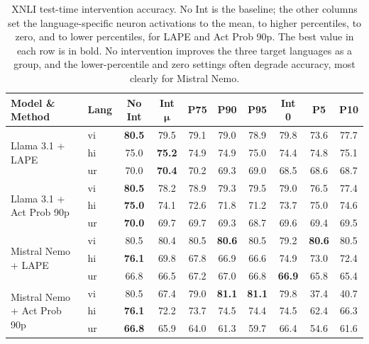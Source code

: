\begin{table}[t]
	\centering
	\renewcommand{\arraystretch}{1.2}
	\setlength{\tabcolsep}{5pt}
	\begin{small}
		\begin{tabular}{llcccccccc}
			\toprule
			\textbf{Model \& Method} & \textbf{Lang} & \textbf{No Int} & \textbf{Int} $\bm{\mu}$ & \textbf{P75} & \textbf{P90} & \textbf{P95} & \textbf{Int 0} & \textbf{P5} & \textbf{P10} \\
			\midrule
			\multirow{3}{*}{Llama 3.1 + LAPE}
			& vi & \textbf{80.5} & 79.5 & 79.1 & 79.0 & 78.9 & 79.8 & 73.6 & 77.7 \\
			& hi & 75.0 & \textbf{75.2} & 74.9 & 74.9 & 75.0 & 74.4 & 74.8 & 75.1 \\
			& ur & 70.0 & \textbf{70.4} & 70.2 & 69.3 & 69.0 & 68.5 & 68.6 & 68.7 \\
			\midrule
			\multirow{3}{*}{Llama 3.1 + Act Prob 90p}
			& vi & \textbf{80.5} & 78.2 & 78.9 & 79.3 & 79.5 & 79.0 & 76.5 & 77.4 \\
			& hi & \textbf{75.0} & 74.1 & 72.6 & 71.8 & 71.2 & 73.7 & 75.0 & 74.6 \\
			& ur & \textbf{70.0} & 69.7 & 69.7 & 69.3 & 68.7 & 69.6 & 69.4 & 69.5 \\
			\midrule
			\multirow{3}{*}{Mistral Nemo + LAPE}
			& vi & 80.5 & 80.4 & 80.5 & \textbf{80.6} & 80.5 & 79.2 & \textbf{80.6} & 80.5 \\
			& hi & \textbf{76.1} & 69.8 & 67.8 & 66.9 & 66.6 & 74.9 & 73.0 & 72.4 \\
			& ur & 66.8 & 66.5 & 67.2 & 67.0 & 66.8 & \textbf{66.9} & 65.8 & 65.4 \\
			\midrule
			\multirow{3}{*}{Mistral Nemo + Act Prob 90p}
			& vi & 80.5 & 67.4 & 79.0 & \textbf{81.1} & \textbf{81.1} & 79.8 & 37.4 & 40.7 \\
			& hi & \textbf{76.1} & 72.2 & 73.7 & 74.5 & 74.4 & 74.5 & 62.4 & 66.3 \\
			& ur & \textbf{66.8} & 65.9 & 64.0 & 61.3 & 59.7 & 66.4 & 54.6 & 61.6 \\
			\bottomrule
		\end{tabular}
	\end{small}
	\caption{XNLI test-time intervention accuracy. No Int is the baseline; the other
		columns set the language-specific neuron activations to the mean, to higher
		percentiles, to zero, and to lower percentiles, for LAPE and Act Prob 90p. The
		best value in each row is in bold. No intervention improves the three target
		languages as a group, and the lower-percentile and zero settings often degrade
		accuracy, most clearly for Mistral Nemo.}
	\label{tab:neurons-xnli-testtime}
\end{table}

